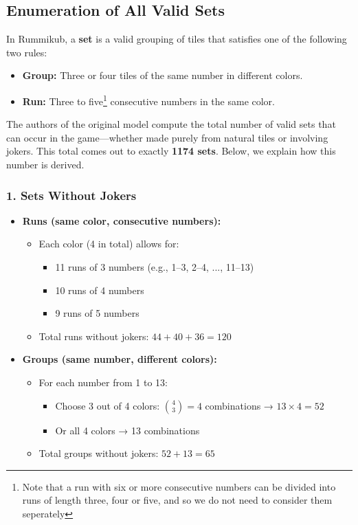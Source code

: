 \documentclass[12pt]{article}
\begin{document}
\subsection{Enumeration of All Valid Sets}

In Rummikub, a \textbf{set} is a valid grouping of tiles that satisfies one of the following two rules:
\begin{itemize}
    \item \textbf{Group:} Three or four tiles of the same number in different colors.
    \item \textbf{Run:} Three to five\footnote{Note that a run with six or more 
    consecutive numbers can be divided into runs of length three, four or five, and
     so we do not need to consider them seperately} consecutive numbers in the same color.
\end{itemize}

The authors of the original model compute the total number of valid sets that can occur in the game---whether made purely from natural tiles or involving jokers. This total comes out to exactly \textbf{1174 sets}. Below, we explain how this number is derived.

\subsubsection*{1. Sets Without Jokers}

\begin{itemize}
    \item \textbf{Runs (same color, consecutive numbers):}
    \begin{itemize}
        \item Each color (4 in total) allows for:
        \begin{itemize}
            \item 11 runs of 3 numbers (e.g., 1--3, 2--4, ..., 11--13)
            \item 10 runs of 4 numbers
            \item 9 runs of 5 numbers
        \end{itemize}
        \item Total runs without jokers: $44 + 40 + 36 = 120$
    \end{itemize}

    \item \textbf{Groups (same number, different colors):}
    \begin{itemize}
        \item For each number from 1 to 13:
        \begin{itemize}
            \item Choose 3 out of 4 colors: $\binom{4}{3} = 4$ combinations → $13 \times 4 = 52$
            \item Or all 4 colors → 13 combinations
        \end{itemize}
        \item Total groups without jokers: $52 + 13 = 65$
    \end{itemize}
\end{itemize}
\end{document}
